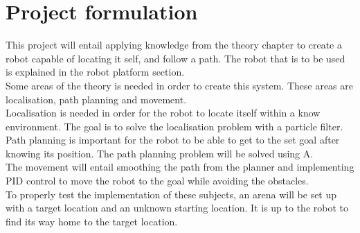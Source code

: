 \section{Project formulation}
This project will entail applying knowledge from the theory chapter to create a robot capable of locating it self, and follow a path. The robot that is to be used is explained in the robot platform section.\\
Some areas of the theory is needed in order to create this system. 
These areas are localisation, path planning and movement. \\
Localisation is needed in order for the robot to locate itself within a know environment. The goal is to solve the localisation problem with a particle filter.\\
Path planning is important for the robot to be able to get to the set goal after knowing its position. The path planning problem will be solved using A\text{*}.\\
The movement will entail smoothing the path from the planner and implementing PID control to move the robot to the goal while avoiding the obstacles.\\
To properly test the implementation of these subjects, an arena will be set up with a target location and an unknown starting location. It is up to the robot to find its way home to the target location.